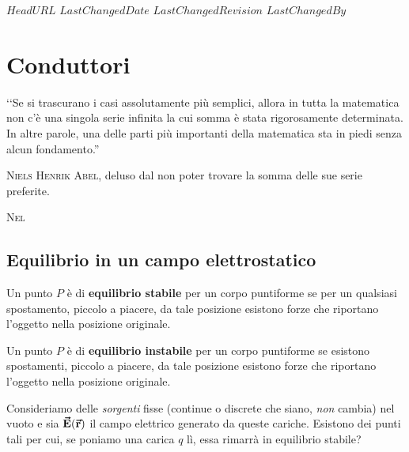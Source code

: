 \svnidlong
{$HeadURL$}
{$LastChangedDate$}
{$LastChangedRevision$}
{$LastChangedBy$}

\chapter{Conduttori}

\begin{introduction}
	‘‘Se si trascurano i casi assolutamente più semplici, allora in tutta la matematica non c'è una singola serie infinita la cui somma è stata rigorosamente determinata. In altre parole, una delle parti più importanti della matematica sta in piedi senza alcun fondamento.''
	\begin{flushright}
		\textsc{Niels Henrik Abel,} deluso dal non poter trovare la somma delle sue serie preferite. %
	\end{flushright}
\end{introduction}
\lettrine[findent=1pt, nindent=0pt]{N}{el} %

\section{Equilibrio in un campo elettrostatico}
\begin{define}
	Un punto $P$ è di \textbf{equilibrio stabile} per un corpo puntiforme se per un qualsiasi spostamento, piccolo a piacere, da tale posizione esistono forze che riportano l'oggetto nella posizione originale.
\end{define}
\begin{define}
	Un punto $P$ è di \textbf{equilibrio instabile} per un corpo puntiforme se esistono spostamenti, piccolo a piacere, da tale posizione esistono forze che riportano l'oggetto nella posizione originale.
\end{define}
Consideriamo delle \textit{sorgenti} fisse (continue o discrete che siano, \textit{non} cambia) nel vuoto e sia $\vb*{\va{E}}(\vb*{\va{r}})$ il campo elettrico generato da queste cariche. Esistono dei punti tali per cui, se poniamo una carica $q$ lì, essa rimarrà in equilibrio stabile?

